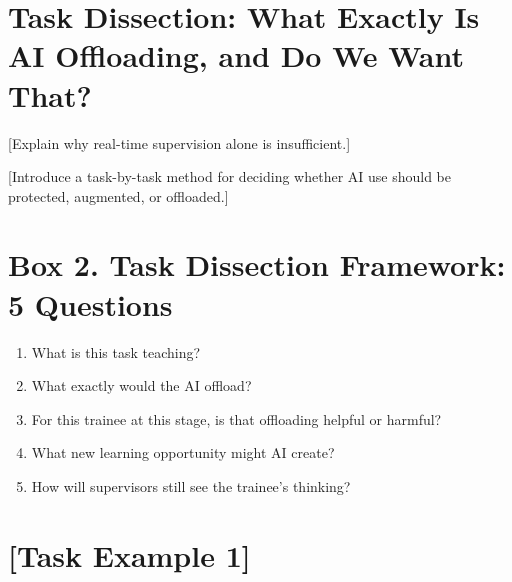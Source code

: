 \documentclass[12pt]{article}
\begin{document}

\section*{Task Dissection: What Exactly Is AI Offloading, and Do We Want That?}


 [Explain why real-time supervision alone is insufficient.]

 [Introduce a task-by-task method for deciding whether AI use should be
  protected, augmented, or offloaded.]


\section*{Box 2. Task Dissection Framework: 5 Questions}

\begin{enumerate}
	\item What is this task teaching?
	\item What exactly would the AI offload?
	\item For this trainee at this stage, is that offloading helpful or harmful?
	\item What new learning opportunity might AI create?
	\item How will supervisors still see the trainee's thinking?
\end{enumerate}



\section*{[Task Example 1]}
\end{document}
